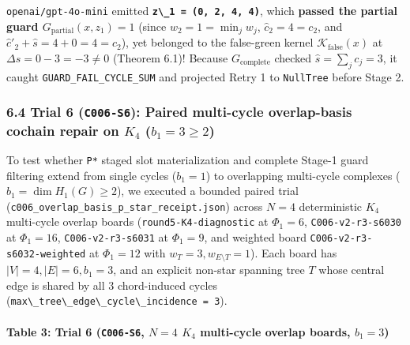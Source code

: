 \documentclass[
  11pt,
]{article}
\newcommand{\passthrough}[1]{#1}
\begin{document}
\begin{enumerate}
\begin{itemize}
    \nolinkurl{openai/gpt-4o-mini} emitted
    \textbf{\passthrough{\lstinline!z\_1 = (0, 2, 4, 4)!}}, which
    \textbf{passed the partial guard
    \(G_{\text{partial}}(x,\allowbreak  z_1) = 1\)} (since
    \(w_2 = 1 = \min_j w_j\), \(\hat{c}_2 = 4 = c_2\), and
    \(\hat{c}'_2 + \hat{s} = 4 + 0 = 4 = c_2\)), yet belonged to the
    false-green kernel \(\mathcal{K}_{\text{false}}(x)\) at
    \(\Delta s = 0 - 3 = -3 \ne 0\) (Theorem 6.1)! Because
    \(G_{\text{complete}}\) checked \(\hat{s} = \sum_j c_j = 3\), it
    caught \nolinkurl{GUARD_FAIL_CYCLE_SUM} and projected Retry 1 to
    \passthrough{\lstinline!NullTree!} before Stage 2.
  \end{itemize}
\end{enumerate}

\subsubsection{\texorpdfstring{6.4 Trial 6 (\texttt{C006-S6}): Paired
multi-cycle overlap-basis cochain repair on \(K_4\)
(\(b_1 = 3 \ge 2\))}{6.4 Trial 6 (C006-S6): Paired multi-cycle overlap-basis cochain repair on K\_4 (b\_1 = 3 \textbackslash ge 2)}}\label{trial-6-c006-s6-paired-multi-cycle-overlap-basis-cochain-repair-on-k_4-b_1-3-ge-2}

To test whether \passthrough{\lstinline!P*!} staged slot materialization
and complete Stage-1 guard filtering extend from single cycles
(\(b_1 = 1\)) to overlapping multi-cycle complexes
(\(b_1 = \dim H_1(G) \ge 2\)), we executed a bounded paired trial
(\nolinkurl{c006_overlap_basis_p_star_receipt.json}) across \(N = 4\)
deterministic \(K_4\) multi-cycle overlap boards
(\nolinkurl{round5-K4-diagnostic} at \(\Phi_1 = 6\),
\nolinkurl{C006-v2-r3-s6030} at \(\Phi_1 = 16\),
\nolinkurl{C006-v2-r3-s6031} at \(\Phi_1 = 9\), and weighted board
\nolinkurl{C006-v2-r3-s6032-weighted} at \(\Phi_1 = 12\) with
\(w_T = 3,\allowbreak  w_{E \setminus T} = 1\)). Each board has
\(|V|=4,\allowbreak  |E|=6,\allowbreak  b_1 = 3\), and an explicit
non-star spanning tree \(T\) whose central edge is shared by all \(3\)
chord-induced cycles
(\passthrough{\lstinline!max\_tree\_edge\_cycle\_incidence = 3!}).

\paragraph{\texorpdfstring{Table 3: Trial 6 (\texttt{C006-S6}, \(N = 4\)
\(K_4\) multi-cycle overlap boards,
\(b_1 = 3\))}{Table 3: Trial 6 (C006-S6, N = 4 K\_4 multi-cycle overlap boards, b\_1 = 3)}}\label{table-3-trial-6-c006-s6-n-4-k_4-multi-cycle-overlap-boards-b_1-3}
\end{document}
